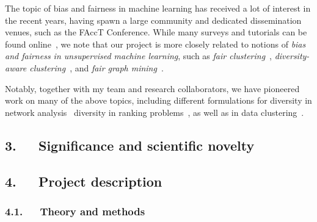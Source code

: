 \documentclass[a4paper,11pt]{article}
\begin{document}

The topic of bias and fairness in machine learning has received a lot of interest in the recent years, 
having spawn a large community and dedicated dissemination venues, such as the FAccT Conference. 
While many surveys and tutorials can be found online~\cite{caton2020fairness,mehrabi2021survey}, 
we note that our project is more closely related to notions of
\emph{bias and fairness in unsupervised machine learning}, 
such as 
\emph{fair clustering}~\cite{chierichetti2017fair}, 
\emph{diversity-aware clustering}~\cite{thejaswi2021diversity}, 
and \emph{fair graph mining}~\cite{dong2023fairness}.


Notably, together with my team and research collaborators, 
we have pioneered work on many of the above topics,
including
different formulations for diversity in network analysis~\cite{adriaens2023minimizing,cinus2023rebalancing,coupette2023reducing,oettershagen2024finding}
diversity in ranking problems~\cite{zhang2022ranking}, 
as well as in data clustering~\cite{thejaswi2021diversity}.

\subsection*{3.~~~Significance and scientific novelty}



\subsection*{4.~~~Project description}


\subsubsection*{4.1.~~~Theory and methods}

\end{document}
